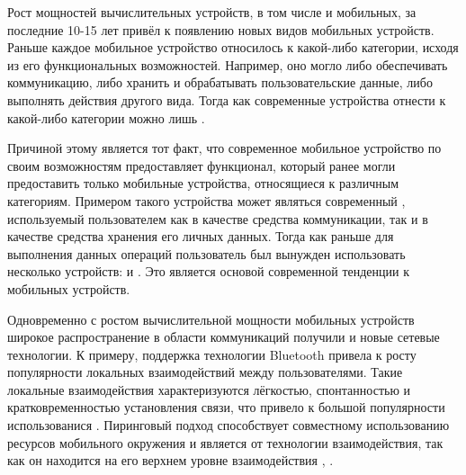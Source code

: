 \Sentence
Рост мощностей вычислительных устройств, в том числе и мобильных, за последние 10-15 лет привёл 
к появлению новых видов мобильных устройств.
\Sentence
Раньше каждое мобильное устройство относилось к какой-либо категории, исходя из его функциональных 
возможностей. Например, оно могло либо обеспечивать коммуникацию, либо хранить и обрабатывать 
пользовательские данные, либо выполнять действия другого вида.
\Sentence
Тогда как современные устройства отнести к какой-либо категории можно лишь .

\Sentence
Причиной этому является тот факт, что современное мобильное устройство по своим возможностям 
предоставляет функционал, который ранее могли предоставить только мобильные устройства, относящиеся 
к различным категориям.
\Sentence
Примером такого устройства может являться современный , используемый 
пользователем как в качестве средства коммуникации, так и в качестве средства хранения его личных 
данных.
\Sentence
Тогда как раньше для выполнения данных операций пользователь был вынужден использовать несколько 
устройств:  и . 
\Sentence
Это является основой современной тенденции к  мобильных устройств.

\Sentence
Одновременно с ростом вычислительной мощности мобильных устройств широкое распространение 
в области коммуникаций получили и новые сетевые технологии.
\Sentence
К примеру, поддержка технологии Bluetooth  привела к росту популярности 
локальных взаимодействий между пользователями.
\Sentence
Такие локальные взаимодействия характеризуются лёгкостью, спонтанностью и кратковременностью 
установления связи, что привело к большой популярности использованися 
 .
\Sentence
Пиринговый подход способствует совместному использованию ресурсов мобильного окружения и является
 от технологии взаимодействия, так как он находится на его верхнем уровне 
взаимодействия , .

\begin{comment} %
\Paragraph{Гетерогенность мобильного пирингового окружения}
\Sentence
Стоит отметить, что следствием процесса коммуникации между различными видами мобильных устройств 
является повышение уровня гетерогенности мобильной коммуникационной среды.
\Sentence
Это может привести к появлению потенциальных проблем, например, к невозможности коммуникации
между мобильными устройствами, имеющими поддержку разных сетевых технологий.
\Sentence
Но в настоящий момент проблемы такого рода решены путём универсальности мобильных устройств в целом, 
в частности, поддержкой устройствами только стандартизированных сетевых технологий 
\WebSite{Bluetooth}, \WebSite{WiFi}.
\end{comment}

